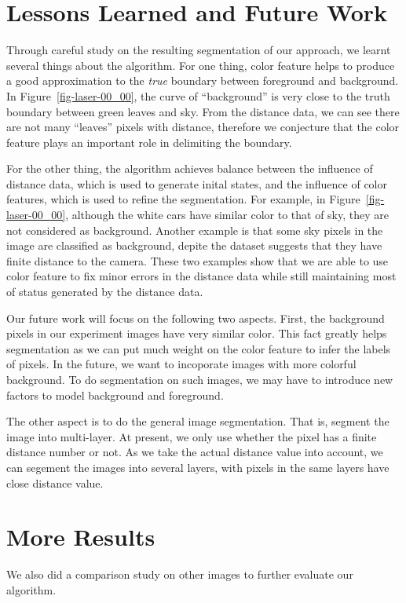 \documentclass{article} %
\begin{document}
\section{Lessons Learned and Future Work}
 Through careful study on the resulting segmentation of our approach,
 we learnt several things about the algorithm.
 For one thing, color feature helps to produce a good approximation to the
 \emph{true} boundary between foreground and background. 
 In Figure~\ref{fig-laser-00_00}, the curve of ``background'' is very close to
 the truth boundary between green leaves and sky. From the distance
 data, we can see there are not many ``leaves'' pixels with
 distance, therefore we conjecture that the color feature plays an
 important role in delimiting the boundary.

 For the other thing, the algorithm achieves balance between the
 influence of distance data, which is used to generate inital states,
 and the influence of color features, which is used to refine the
 segmentation. 
 For example, in Figure~\ref{fig-laser-00_00}, although the white cars have similar color
 to that of sky, they are not considered as background.  
 Another example is that some sky pixels in the image are classified
 as background, depite the dataset suggests that they have finite
 distance to the camera.  
 These two examples show that we are able to use color feature to fix
 minor errors in the distance data while still maintaining most of
 status generated by the distance data.

Our future work will focus on the following two aspects.
First, the background pixels in our experiment images have very
similar color. This fact greatly helps segmentation as we can put much
weight on the color feature to infer the labels of pixels. In the
future, we want to incoporate images with more colorful
background. To do segmentation on such images, we may have to
introduce new factors to model background and foreground.

The other aspect is to do the general image segmentation. That is,
segment the image into multi-layer. At present, we only use whether
the pixel has a finite distance number or not. As we take the actual
distance value into account, we can segement the images into several
layers, with pixels in the same layers have close distance value.

\section{More Results}
We also did a comparison study on other images to further evaluate our algorithm. 
\end{document}
